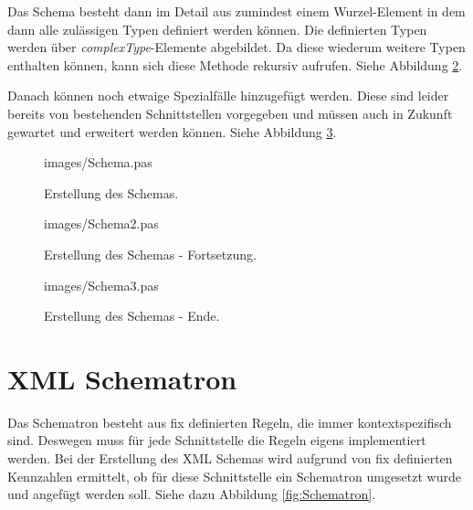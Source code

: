 Das Schema besteht dann im Detail aus zumindest einem Wurzel-Element in dem dann alle zulässigen Typen definiert werden können. Die definierten Typen werden über \emph{complexType}-Elemente abgebildet. Da diese wiederum weitere Typen enthalten können, kann sich diese Methode rekursiv aufrufen. Siehe Abbildung \ref{fig:SchemaF}.

Danach können noch etwaige Spezialfälle hinzugefügt werden. Diese sind leider bereits von bestehenden Schnittstellen vorgegeben und müssen auch in Zukunft gewartet und erweitert werden können. Siehe Abbildung \ref{fig:SchemaE}.
 

\begin{figure}
\lstset{language=Pascal, 
        basicstyle=\tiny\ttfamily, 
        numbers=left,
        numberstyle=\tiny, 
        stepnumber=5, 
        firstnumber=0,
        showstringspaces=false}
 {images/Schema.pas}
\caption{Erstellung des Schemas.}
 \label{fig:Schemas}
 \end{figure}
 
\begin{figure}
\lstset{language=Pascal, 
        basicstyle=\tiny\ttfamily, 
        numbers=left,
        numberstyle=\tiny, 
        stepnumber=5, 
        firstnumber=0,
        showstringspaces=false}
 {images/Schema2.pas}
\caption{Erstellung des Schemas - Fortsetzung.}
 \label{fig:SchemaF}
 \end{figure}
 
\begin{figure}
\lstset{language=Pascal, 
        basicstyle=\tiny\ttfamily, 
        numbers=left,
        numberstyle=\tiny, 
        stepnumber=5, 
        firstnumber=0,
        showstringspaces=false}
 {images/Schema3.pas}
\caption{Erstellung des Schemas - Ende.}
 \label{fig:SchemaE}
 \end{figure}

\section{XML Schematron}
Das Schematron besteht aus fix definierten Regeln, die immer kontextspezifisch sind. 
Deswegen muss für jede Schnittstelle die Regeln eigens implementiert werden.
Bei der Erstellung des XML Schemas wird aufgrund von fix definierten Kennzahlen ermittelt, ob für diese Schnittstelle ein Schematron umgesetzt wurde und angefügt werden soll. 
Siehe dazu Abbildung \ref{fig:Schematron}.

